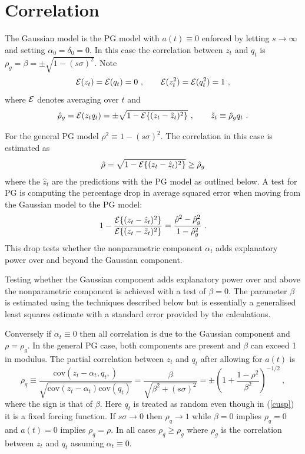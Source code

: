 \documentclass[authoryear]{elsarticle}
\newcommand{\cov}{\mathrm{cov}}
\newcommand{\Ex}{{\cal E}}
\newcommand{\eref}[1]{(\ref{#1})}
\newcommand{\cq}{\ , \qquad}
\newcommand{\be}[1]{\begin{equation}\label{#1}}
\newcommand{\ee}{\end{equation}}
\begin{document}
\section{Correlation}

The Gaussian model is the PG model with $a(t)\equiv 0$ enforced by letting $s\rightarrow\infty$ and setting $\alpha_0=\delta_0=0$.   In this case the correlation between $z_t$ and $q_t$ is $\rho_g=\beta=\pm\sqrt{1-(s\sigma)^2}$.    Note 
$$
\Ex(z_t)=\Ex(q_t)=0\cq \Ex(z_t^2)=\Ex(q_t^2)=1\ ,
$$
where $\Ex$ denotes averaging over $t$ and 
\be{ess}
 \hat\rho_g =\Ex(z_tq_t) =\pm\sqrt{1-\Ex\{(z_t-\tilde z_t)^2\}}\cq \tilde z_t\equiv\hat\rho_gq_t\ .
\ee

For the general PG model  $\rho^2\equiv 1-(s\sigma)^2$.   The correlation in this case  is estimated as 
$$
\hat\rho = \sqrt{1- \Ex\{(z_t-\hat z_t)^2\}}\ge \hat\rho_g
$$
where the $\hat z_t$ are the predictions  with the PG model as outlined below.   A test for PG is  computing  the percentage drop in  average squared error when moving from the Gaussian model to the PG model: 
$$
1-\frac{\Ex\{(z_t-\hat z_t)^2\}}{\Ex\{(z_t-\tilde z_t)^2\}} = \frac{\hat \rho^2-\hat \rho^2_g}{1-\hat\rho^2_g}\ .
$$
This drop tests whether the nonparametric component $\alpha_t$ adds  explanatory power over and beyond the Gaussian component.

Testing whether the  Gaussian component adds explanatory power over and above the nonparametric component is achieved with a test of  $\beta=0$.   The parameter $\beta$ is estimated using the techniques described below but is essentially a generalised least squares estimate with a standard error provided by the calculations.    



  Conversely if $\alpha_t\equiv 0$ then all correlation is due to the Gaussian component and $\rho=\rho_g$.  In the general PG case, both components are present and $\beta$ can exceed 1 in modulus. 
The partial correlation between $z_t$ and $q_t$ after allowing for $a(t)$ is
\be{rhoq}
\rho_q\equiv\frac{\cov(z_t-\alpha_t,q_t,)}{\sqrt{\cov(z_t-\alpha_t)\cov(q_t)}} = \frac{\beta}{\sqrt{\beta^2+(s\sigma)^2}}=\pm\left(1+\frac{1-\rho^2}{\beta^2}\right)^{-1/2}\ ,
\ee
where the sign is that of $\beta$.  Here $q_t$ is treated as random even though in \eref{cusp} it is a fixed forcing function.  If $s\sigma\rightarrow 0$ then $\rho_q\rightarrow 1$ while $\beta=0$ implies $\rho_q=0$   
and $a(t)=0$  implies  $\rho_q=\rho$.  In all cases $\rho_q\ge \rho_g$ where $\rho_g$ is the correlation between $z_t$ and $q_t$ assuming $\alpha_t\equiv 0$.  
\end{document}
